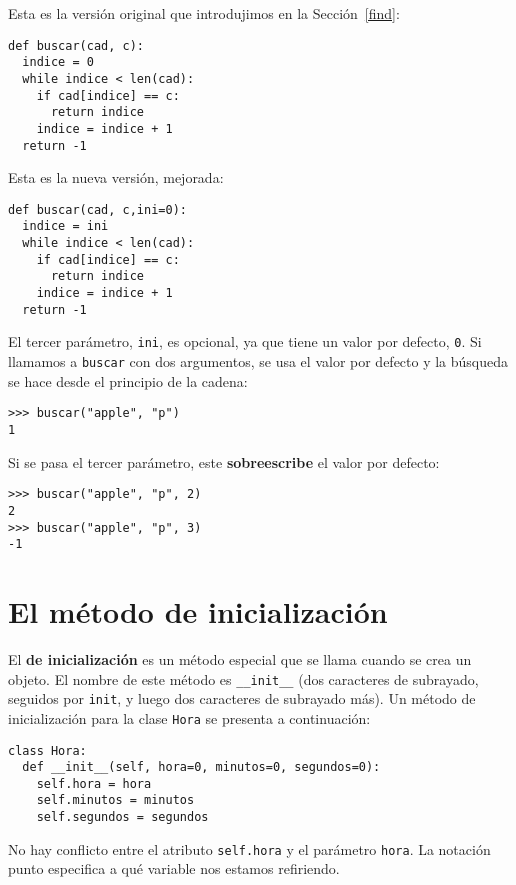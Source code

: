 Esta es la versión original que introdujimos en la Sección~\ref{find}:

\pagebreak{}

\begin{verbatim}
def buscar(cad, c):
  indice = 0
  while indice < len(cad):
    if cad[indice] == c:
      return indice
    indice = indice + 1
  return -1
\end{verbatim}
 Esta es la nueva versión, mejorada:
\begin{verbatim}
def buscar(cad, c,ini=0):
  indice = ini
  while indice < len(cad):
    if cad[indice] == c:
      return indice
    indice = indice + 1
  return -1
\end{verbatim}

El tercer parámetro, \texttt{ini}, es opcional, ya que tiene un valor
por defecto, \texttt{0}. Si llamamos a \texttt{buscar} con dos argumentos,
se usa el valor por defecto y la búsqueda se hace desde el principio
de la cadena:
\begin{verbatim}
>>> buscar("apple", "p")
1
\end{verbatim}

Si se pasa el tercer parámetro, este \textbf{sobreescribe} el valor
por defecto:
\begin{verbatim}
>>> buscar("apple", "p", 2)
2
>>> buscar("apple", "p", 3)
-1
\end{verbatim}

\section{El método de inicialización}

 

El \textbf{de inicialización} es un método especial que se llama cuando
se crea un objeto. El nombre de este método es \texttt{\_\_init\_\_}
(dos caracteres de subrayado, seguidos por \texttt{init}, y luego
dos caracteres de subrayado más). Un método de inicialización para
la clase \texttt{Hora} se presenta a continuación:
\begin{verbatim}
class Hora:
  def __init__(self, hora=0, minutos=0, segundos=0):
    self.hora = hora
    self.minutos = minutos
    self.segundos = segundos
\end{verbatim}

No hay conflicto entre el atributo \texttt{self.hora} y el parámetro
\texttt{hora}. La notación punto especifica a qué variable nos estamos
refiriendo.

